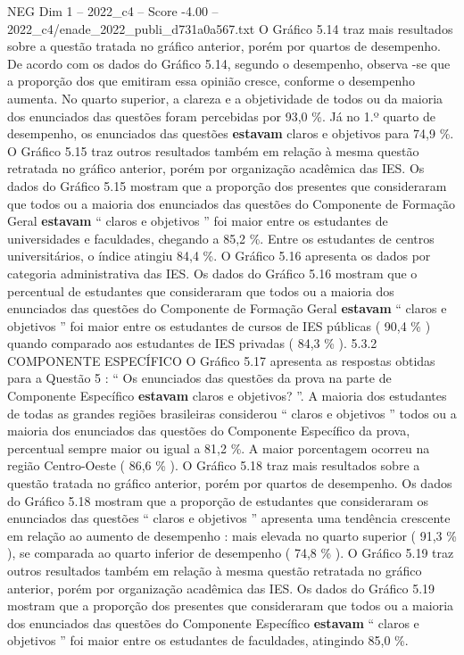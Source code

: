 \begin{textsample}{NEG Dim 1 – 2022\_c4 – Score -4.00 – 2022\_c4/enade\_2022\_publi\_d731a0a567.txt}
O Gráfico 5.14 traz mais resultados sobre a questão tratada no gráfico anterior, porém por quartos de desempenho.
De acordo com os dados do Gráfico 5.14, segundo o desempenho, observa -se que a proporção dos que emitiram essa opinião cresce, conforme o desempenho aumenta.
No quarto superior, a clareza e a objetividade de todos ou da maioria dos enunciados das questões foram percebidas por 93,0 \%.
Já no 1.º quarto de desempenho, os enunciados das questões \textbf{estavam} claros e objetivos para 74,9 \%.
O Gráfico 5.15 traz outros resultados também em relação à mesma questão retratada no gráfico anterior, porém por organização acadêmica das IES.
Os dados do Gráfico 5.15 mostram que a proporção dos presentes que consideraram que todos ou a maioria dos enunciados das questões do Componente de Formação Geral \textbf{estavam} “ claros e objetivos ” foi maior entre os estudantes de universidades e faculdades, chegando a 85,2 \%.
Entre os estudantes de centros universitários, o índice atingiu 84,4 \%.
O Gráfico 5.16 apresenta os dados por categoria administrativa das IES.
Os dados do Gráfico 5.16 mostram que o percentual de estudantes que consideraram que todos ou a maioria dos enunciados das questões do Componente de Formação Geral \textbf{estavam} “ claros e objetivos ” foi maior entre os estudantes de cursos de IES públicas ( 90,4 \% ) quando comparado aos estudantes de IES privadas ( 84,3 \% ). 5.3.2 COMPONENTE ESPECÍFICO O Gráfico 5.17 apresenta as respostas obtidas para a Questão 5 : “ Os enunciados das questões da prova na parte de Componente Específico \textbf{estavam} claros e objetivos? ”.
A maioria dos estudantes de todas as grandes regiões brasileiras considerou “ claros e objetivos ” todos ou a maioria dos enunciados das questões do Componente Específico da prova, percentual sempre maior ou igual a 81,2 \%.
A maior porcentagem ocorreu na região Centro-Oeste ( 86,6 \% ).
O Gráfico 5.18 traz mais resultados sobre a questão tratada no gráfico anterior, porém por quartos de desempenho.
Os dados do Gráfico 5.18 mostram que a proporção de estudantes que consideraram os enunciados das questões “ claros e objetivos ” apresenta uma tendência crescente em relação ao aumento de desempenho : mais elevada no quarto superior ( 91,3 \% ), se comparada ao quarto inferior de desempenho ( 74,8 \% ).
O Gráfico 5.19 traz outros resultados também em relação à mesma questão retratada no gráfico anterior, porém por organização acadêmica das IES.
Os dados do Gráfico 5.19 mostram que a proporção dos presentes que consideraram que todos ou a maioria dos enunciados das questões do Componente Específico \textbf{estavam} “ claros e objetivos ” foi maior entre os estudantes de faculdades, atingindo 85,0 \%.

\end{textsample}
